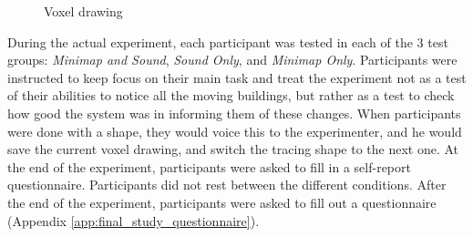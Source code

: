 \begin{figure}
	\centering

	\par \smallskip
	\par \smallskip

	\caption{Voxel drawing}
	\label{fig:finalstudyvoxeldrawing}
\end{figure}


During the actual experiment, each participant was tested in each of the 3 test groups: \textit{Minimap and Sound}, \textit{Sound Only}, and \textit{Minimap Only}. Participants were instructed to keep focus on their main task and treat the experiment not as a test of their abilities to notice all the moving buildings, but rather as a test to check how good the system was in informing them of these changes. 
When participants were done with a shape, they would voice this to the experimenter, and he would save the current voxel drawing, and switch the tracing shape to the next one.
At the end of the experiment, participants were asked to fill in a self-report questionnaire.
Participants did not rest between the different conditions. 
After the end of the experiment, participants were asked to fill out a questionnaire (Appendix \ref{app:final_study_questionnaire}).

